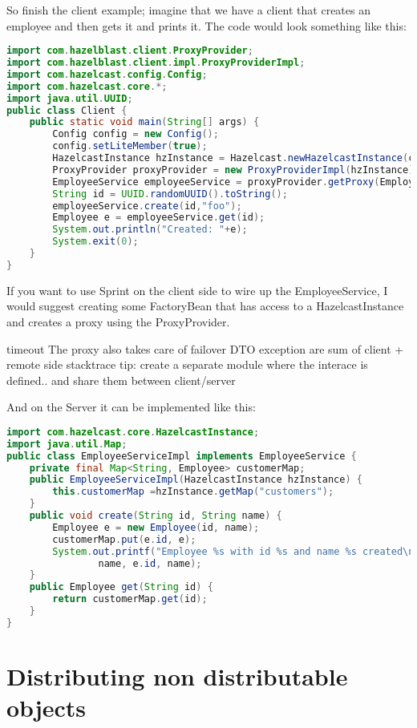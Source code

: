So finish the client example; imagine that we have a client that creates an employee and then gets it and prints it. The code would look something like this:
\begin{lstlisting}[language=java]
import com.hazelblast.client.ProxyProvider;
import com.hazelblast.client.impl.ProxyProviderImpl;
import com.hazelcast.config.Config;
import com.hazelcast.core.*;
import java.util.UUID;
public class Client {
    public static void main(String[] args) {
        Config config = new Config();
        config.setLiteMember(true);
        HazelcastInstance hzInstance = Hazelcast.newHazelcastInstance(config);
        ProxyProvider proxyProvider = new ProxyProviderImpl(hzInstance);
        EmployeeService employeeService = proxyProvider.getProxy(EmployeeService.class);
        String id = UUID.randomUUID().toString();
        employeeService.create(id,"foo");
        Employee e = employeeService.get(id);
        System.out.println("Created: "+e);
        System.exit(0);
    }
}
\end{lstlisting}
If you want to use Sprint on the client side to wire up the EmployeeService, I would suggest creating some FactoryBean that has access to a HazelcastInstance and creates a proxy using the ProxyProvider.


timeout
The proxy also takes care of failover
DTO
exception are sum of client + remote side stacktrace
tip: create a separate module where the interace is defined.. and share them between client/server

And on the Server it can be implemented like this:
\begin{lstlisting}[language=java]
import com.hazelcast.core.HazelcastInstance;
import java.util.Map;
public class EmployeeServiceImpl implements EmployeeService {
    private final Map<String, Employee> customerMap;
    public EmployeeServiceImpl(HazelcastInstance hzInstance) {
        this.customerMap =hzInstance.getMap("customers");
    }
    public void create(String id, String name) {
        Employee e = new Employee(id, name);
        customerMap.put(e.id, e);
        System.out.printf("Employee %s with id %s and name %s created\n",
                name, e.id, name);
    }
    public Employee get(String id) {
        return customerMap.get(id);
    }
}

\end{lstlisting}

\section{Distributing non distributable objects}

